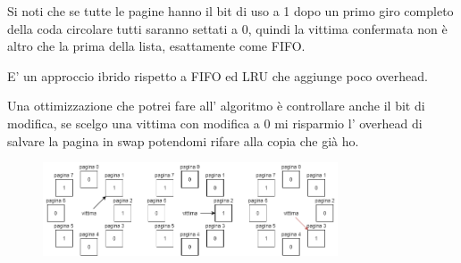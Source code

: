 Si noti che se tutte le pagine hanno il bit di uso a 1 dopo un primo giro completo della coda circolare tutti saranno settati a 0, quindi la vittima confermata non è altro che la prima della lista, esattamente come FIFO.

E' un approccio ibrido rispetto a FIFO ed LRU che aggiunge poco overhead.

Una ottimizzazione che potrei fare all' algoritmo è controllare anche il bit di modifica, se scelgo una vittima con modifica a 0 mi risparmio l' overhead di salvare la pagina in swap potendomi rifare alla copia che già ho.

\begin{figure}[H]
    \centering
    \includegraphics[width=330px]{images/9_Gestione_della_memoria/second_chance.png}
\end{figure}

